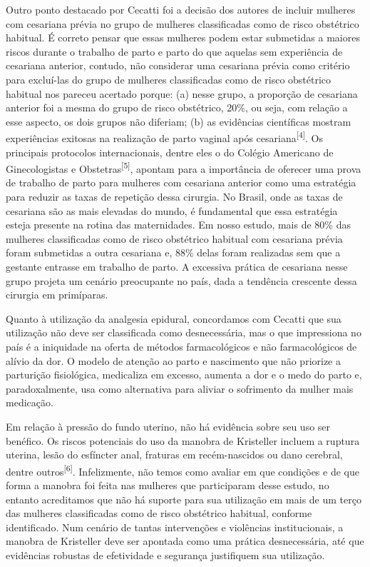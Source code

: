 \documentclass{article}
\begin{document}
Outro ponto destacado por Cecatti foi a decisão dos autores de incluir mulheres
com
cesariana prévia no grupo de mulheres classificadas como de risco obstétrico
habitual. É
correto pensar que essas mulheres podem estar submetidas a maiores riscos
durante o
trabalho de parto e parto do que aquelas sem experiência de cesariana anterior,
contudo,
não considerar uma cesariana prévia como critério para excluí-las do grupo de
mulheres
classificadas como de risco obstétrico habitual nos pareceu acertado porque: (a)
nesse
grupo, a proporção de cesariana anterior foi a mesma do grupo de risco
obstétrico, 20\%,
ou seja, com relação a esse aspecto, os dois grupos não diferiam; (b) as
evidências
científicas mostram experiências exitosas na realização de parto vaginal após
cesariana\textsuperscript{[}\textsuperscript{4}\textsuperscript{]}. Os principais protocolos
internacionais, dentre eles o do Colégio Americano de Ginecologistas e Obstetras\textsuperscript{[}\textsuperscript{5}\textsuperscript{]}, apontam para a importância de oferecer
uma prova de trabalho de parto para mulheres com cesariana anterior como uma
estratégia
para reduzir as taxas de repetição dessa cirurgia. No Brasil, onde as taxas de
cesariana
são as mais elevadas do mundo, é fundamental que essa estratégia esteja presente
na
rotina das maternidades. Em nosso estudo, mais de 80\% das mulheres
classificadas como de
risco obstétrico habitual com cesariana prévia foram submetidas a outra
cesariana e, 88\%
delas foram realizadas sem que a gestante entrasse em trabalho de parto. A
excessiva
prática de cesariana nesse grupo projeta um cenário preocupante no país, dada a
tendência crescente dessa cirurgia em primíparas.

Quanto à utilização da analgesia epidural, concordamos com Cecatti que sua
utilização não
deve ser classificada como desnecessária, mas o que impressiona no país é a
iniquidade
na oferta de métodos farmacológicos e não farmacológicos de alívio da dor. O
modelo de
atenção ao parto e nascimento que não priorize a parturição fisiológica,
medicaliza em
excesso, aumenta a dor e o medo do parto e, paradoxalmente, usa como alternativa
para
aliviar o sofrimento da mulher mais medicação.

Em relação à pressão do fundo uterino, não há evidência sobre seu uso ser
benéfico. Os
riscos potenciais do uso da manobra de Kristeller incluem a ruptura uterina,
lesão do
esfíncter anal, fraturas em recém-nascidos ou dano cerebral, dentre outros\textsuperscript{[}\textsuperscript{6}\textsuperscript{]}. Infelizmente, não temos como avaliar
em que condições e de que forma a manobra foi feita nas mulheres que
participaram desse
estudo, no entanto acreditamos que não há suporte para sua utilização em mais de
um
terço das mulheres classificadas como de risco obstétrico habitual, conforme
identificado. Num cenário de tantas intervenções e violências institucionais, a
manobra
de Kristeller deve ser apontada como uma prática desnecessária, até que
evidências
robustas de efetividade e segurança justifiquem sua utilização.
\end{document}
